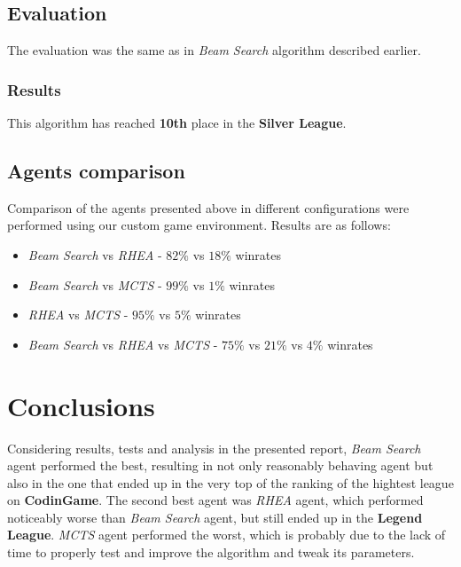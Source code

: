 \documentclass[11pt]{article}
\begin{document}
	\subsection*{Evaluation}
	The evaluation was the same as in \textit{Beam Search} algorithm described earlier.
    
    \subsubsection*{Results}
    This algorithm has reached \textbf{10th} place in the \textbf{Silver League}.
 	
 	\subsection{Agents comparison}
 	Comparison of the agents presented above in different configurations were performed using our custom game environment. Results are as follows:
 	\begin{itemize}
 	    \item \textit{Beam Search} vs \textit{RHEA} - $82\%$ vs $18\%$ winrates
 	    \item \textit{Beam Search} vs \textit{MCTS} - $99\%$ vs $1\%$ winrates
 	    \item \textit{RHEA} vs \textit{MCTS} - $95\%$ vs $5\%$ winrates
 	    \item \textit{Beam Search} vs \textit{RHEA} vs \textit{MCTS} - $75\%$ vs $21\%$ vs $4\%$ winrates
 	\end{itemize}

 	\section{Conclusions}
 	Considering results, tests and analysis in the presented report, \textit{Beam Search} agent performed the best, resulting in not only reasonably behaving agent but also in the one that ended up in the very top of the ranking of the hightest league on \textbf{CodinGame}. The second best agent was \textit{RHEA} agent, which performed noticeably worse than \textit{Beam Search} agent, but still ended up in the \textbf{Legend League}. \textit{MCTS} agent performed the worst, which is probably due to the lack of time to properly test and improve the algorithm and tweak its parameters.
    
\end{document}
